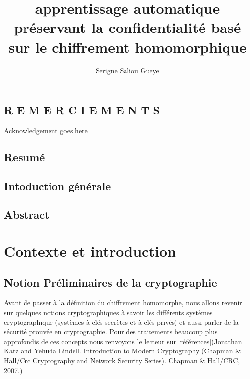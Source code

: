 \documentclass[12pt]{report}
\title{apprentissage automatique préservant la confidentialité basé sur le chiffrement  homomorphique}
\author{Serigne Saliou Gueye }
\begin{document}
\chapter*{R E M E R C I E M E N T S}
Acknowledgement goes here
\chapter*{Resumé}
\chapter*{Intoduction générale}
\chapter*{Abstract}
\tableofcontents

\part{Contexte et introduction}
\chapter{Notion Préliminaires de la cryptographie}
Avant de passer à la définition du chiffrement homomorphe, nous allons revenir sur quelques notions cryptographiques à savoir les différents systèmes cryptographique (systèmes à clés secrètes et à clés privés) et aussi parler de la sécurité prouvée en cryptographie. Pour des traitements beaucoup plus approfondis de ces concepts nous renvoyons le lecteur sur [références](Jonathan Katz and Yehuda Lindell. Introduction to Modern Cryptography (Chapman &
Hall/Crc Cryptography and Network Security Series). Chapman & Hall/CRC, 2007.)

\end{document}
